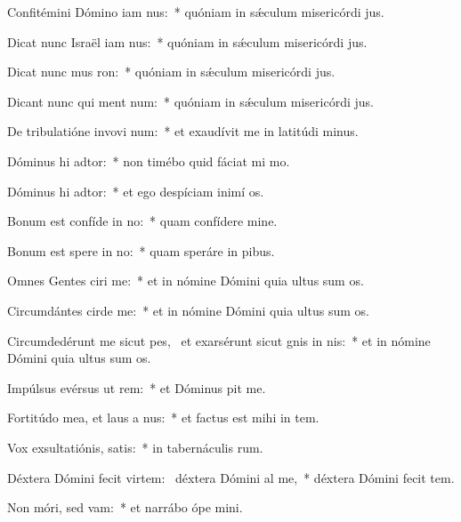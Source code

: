 \item Confitémini Dómino iam nus:~* quóniam in sǽculum misericórdi jus.
\item Dicat nunc Israël iam nus:~* quóniam in sǽculum misericórdi jus.
\item Dicat nunc mus ron:~* quóniam in sǽculum misericórdi jus.
\item Dicant nunc qui ment num:~* quóniam in sǽculum misericórdi jus.
\item De tribulatióne invovi num:~* et exaudívit me in latitúdi minus.
\item Dóminus hi adtor:~* non timébo quid fáciat mi mo.
\item Dóminus hi adtor:~* et ego despíciam inimí os.
\item Bonum est confíde in no:~* quam confídere  mine.
\item Bonum est spere in no:~* quam speráre in pibus.
\item Omnes Gentes ciri me:~* et in nómine Dómini quia ultus sum  os.
\item Circumdántes cirde me:~* et in nómine Dómini quia ultus sum  os.
\item Circumdedérunt me sicut pes,~\pscross{} et exarsérunt sicut gnis in nis:~* et in nómine Dómini quia ultus sum  os.
\item Impúlsus evérsus  ut rem:~* et Dóminus pit me.
\item Fortitúdo mea, et laus a nus:~* et factus est mihi in tem.
\item Vox exsultatiónis,  satis:~* in tabernáculis rum.
\item Déxtera Dómini fecit virtem:~\pscross{} déxtera Dómini al me,~* déxtera Dómini fecit tem.
\item Non móri, sed vam:~* et narrábo ópe mini.
